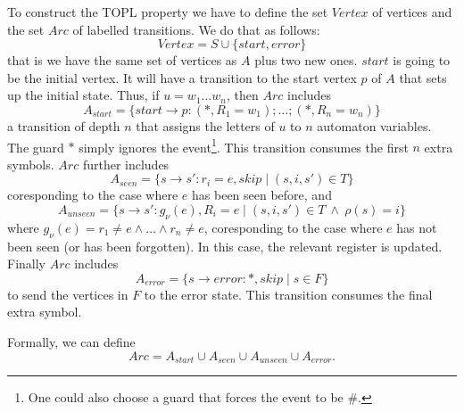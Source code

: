 \newcommand{\Vertex}{\mathit{Vertex}}
\newcommand{\Arc}{\mathit{Arc}}
\newcommand{\sstart}{\mathit{start}}
\newcommand{\serror}{\mathit{error}}
\newcommand{\seen}{\mathit{seen}}
\newcommand{\unseen}{\mathit{unseen}}
To construct the TOPL property we have to define the set $\Vertex$
of vertices and the set $\Arc$ of labelled transitions. We do that as follows:
\[
\Vertex = S \cup \{\sstart, \serror\}
\]
that is we have the same set of vertices as $A$ plus two new
ones. $start$ is going to be the initial vertex. It will have a
transition to the start vertex $p$ of $A$ that sets up the
initial state. Thus, if $u = w_1\ldots w_n$, then $\Arc$ includes
\[
A_{\sstart} = \{\sstart \to p: (*,R_1=w_1);\ldots;(*,R_n=w_n) \}
\]
a transition of depth $n$ that assigns the letters of $u$
to $n$ automaton variables. The guard $*$ simply ignores the
event\footnote{One could also choose a guard that forces the event
to be \#.}. This transition consumes the first $n$ extra
symbols. $\Arc$ further includes
\[
A_{\seen} = \{s\to s': r_i=e, skip \mid (s, i, s') \in T \}
\]
coresponding to the case where $e$ has been seen before, and
\[
A_{unseen} = \{s\to s': g_\nu(e), R_i=e \mid (s, i, s') \in T\ \land\ \rho(s)=i \}
\]
where $g_\nu(e) = r_1 \neq e \land \ldots \land r_n \neq e$,
coresponding to the case where $e$ has not been seen (or has been
forgotten). In this case, the relevant register is
updated. Finally $\Arc$ includes
\[
A_{\serror} = \{s\to \serror: *, skip \mid s\in F \}
\]
to send the vertices in $F$ to the error state. This transition
consumes the final extra symbol.

Formally, we can define
\[
\Arc = A_{\sstart} \cup A_{\seen} \cup A_{\unseen} \cup A_{\serror}.
\]
